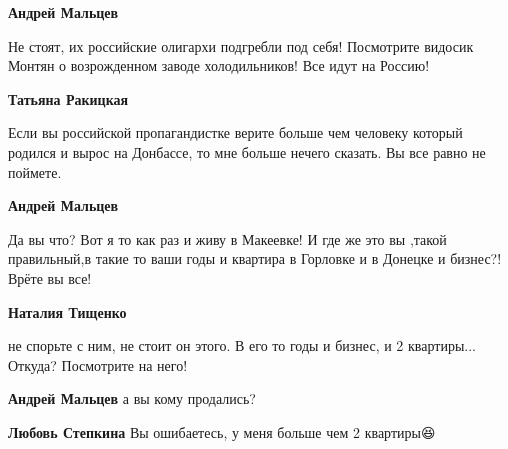 \begin{itemize}
\begin{itemize}
\textbf{Андрей Мальцев} 

Не стоят, их российские олигархи подгребли под
себя! Посмотрите видосик Монтян о возрожденном заводе холодильников! Все идут на
Россию!


 
\textbf{Татьяна Ракицкая} 

Если вы российской пропагандистке верите больше чем
человеку который родился и вырос на Донбассе, то мне больше нечего сказать. Вы
все равно не поймете.


 
\textbf{Андрей Мальцев} 

Да вы что? Вот я то как раз и живу в Макеевке! И где же это вы ,такой
правильный,в такие то ваши годы и квартира в Горловке и в Донецке и бизнес?!
Врёте вы все!


 
\textbf{Наталия Тищенко} 

не спорьте с ним, не стоит он этого. В его то годы и бизнес, и 2 квартиры...
Откуда? Посмотрите на него!


 
\textbf{Андрей Мальцев} а вы кому продались?

 
\textbf{Любовь Степкина} Вы ошибаетесь, у меня больше чем 2 квартиры😆


\end{itemize}
\end{itemize}
